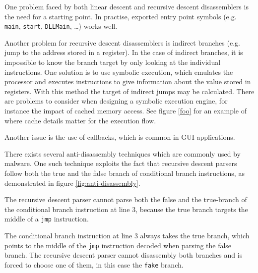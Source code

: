 One problem faced by both linear descent and recursive descent disassemblers is the need for a starting point. In practise, exported entry point symbols (e.g. \texttt{main}, \texttt{start}, \texttt{DLLMain}, …) works well.


Another problem for recursive descent disassemblers is indirect branches (e.g. jump to the address stored in a register). In the case of indirect branches, it is impossible to know the branch target by only looking at the individual instructions. One solution is to use symbolic execution, which emulates the processor and executes instructions to give information about the value stored in registers. With this method the target of indirect jumps may be calculated. There are problems to consider when designing a symbolic execution engine, for instance the impact of cached memory access. See figure \ref{foo} for an example of where cache details matter for the execution flow.



Another issue is the use of callbacks, which is common in GUI applications.

There exists several anti-disassembly techniques which are commonly used by malware. One such technique exploits the fact that recursive descent parsers follow both the true and the false branch of conditional branch instructions, as demonstrated in figure \ref{fig:anti-disassembly}.

The recursive descent parser cannot parse both the false and the true-branch of the conditional branch instruction at line 3, because the true branch targets the middle of a \texttt{jmp} instruction.

The conditional branch instruction at line 3 always takes the true branch, which points to the middle of the \texttt{jmp} instruction decoded when parsing the false branch. The recursive descent parser cannot disassembly both branches and is forced to choose one of them, in this case the \texttt{fake} branch.

